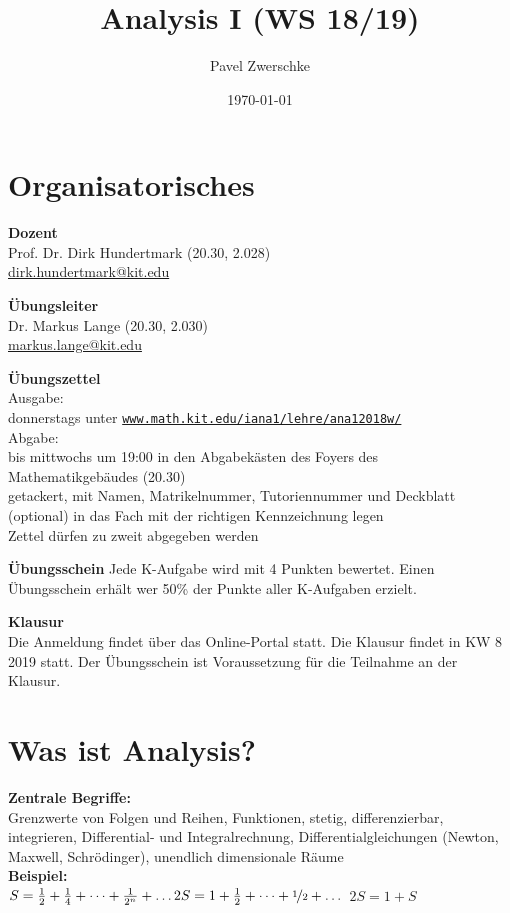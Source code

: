\documentclass[12pt,a4paper,titlepage]{article} %
\newcommand{\bsp}{\textbf{Beispiel:}\\}
\begin{document}
\title{Analysis I (WS 18/19)}
\date{\today}
\author{Pavel Zwerschke}
\maketitle

\tableofcontents
\newpage

\setcounter{section}{-1}
\section{Organisatorisches}
\textbf{Dozent}\\
Prof. Dr. Dirk Hundertmark (20.30, 2.028)\\
\href{mailto:dirk.hundertmark@kit.edu}{dirk.hundertmark@kit.edu}

\textbf{Übungsleiter}\\
Dr. Markus Lange (20.30, 2.030)\\
\href{mailto:markus.lange@kit.edu}{markus.lange@kit.edu}

\textbf{Übungszettel}\\
Ausgabe:\\
donnerstags unter \href{http://www.math.kit.edu/iana1/lehre/ana12018w/}{\texttt{www.math.kit.edu/iana1/lehre/ana12018w/}}\\
Abgabe:\\
bis mittwochs um 19:00 in den Abgabekästen des Foyers des Mathematikgebäudes (20.30)\\
getackert, mit Namen, Matrikelnummer, Tutoriennummer und Deckblatt (optional) in das Fach mit der richtigen Kennzeichnung legen\\
Zettel dürfen zu zweit abgegeben werden

\textbf{Übungsschein}
Jede K-Aufgabe wird mit 4 Punkten bewertet. Einen Übungsschein erhält wer 50\% der Punkte aller K-Aufgaben erzielt.

\textbf{Klausur}\\
Die Anmeldung findet über das Online-Portal statt. Die Klausur findet in KW 8 2019 statt. Der Übungsschein ist Voraussetzung für die Teilnahme an der Klausur.

\newpage

\section{Was ist Analysis?}
\textbf{Zentrale Begriffe:}\\
Grenzwerte von Folgen und Reihen, Funktionen, stetig, differenzierbar, integrieren, Differential- und Integralrechnung, Differentialgleichungen (Newton, Maxwell, Schrödinger), unendlich dimensionale Räume\\

\bsp
$S = \frac{1}{2} + \frac{1}{4} + \dots + \frac{1}{2^n} + \dots\\
2S = 1 + \frac{1}{2} + \dots + \nicefrac{1}{2} + \dots\\$
$2S = 1 + S$
\end{document}
